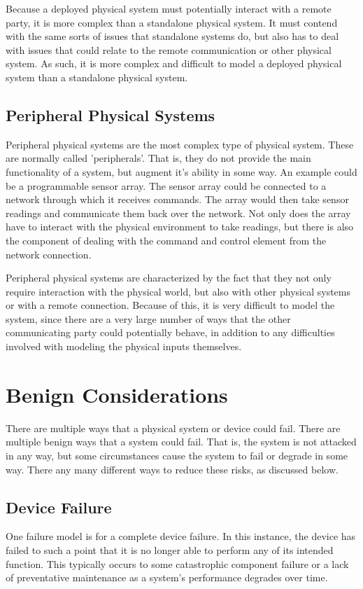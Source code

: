 Because a deployed physical system must potentially interact with a remote party, it is more complex than a standalone physical
system. It must contend with the same sorts of issues that standalone systems do, but also has to deal with issues that could
relate to the remote communication or other physical system.  As such, it is more complex and difficult to model a deployed
physical system than a standalone physical system.

\subsection{Peripheral Physical Systems}
Peripheral physical systems are the most complex type of physical system. These are normally called 'peripherals'. That
is, they do not provide the main functionality of a system, but augment it's ability in some way. An example could be a 
programmable sensor array. The sensor array could be connected to a network through which it receives commands. The array
would then take sensor readings and communicate them back over the network. Not only does the array have to 
interact with the physical environment to take readings, but there is also the component of dealing with the
command and control element from the network connection.

Peripheral physical systems are characterized by the fact that they not only require interaction with the physical world, but
also with other physical systems or with a remote connection. Because of this, it is very difficult to model the system, since
there are a very large number of ways that the other communicating party could potentially behave, in addition to any difficulties
involved with modeling the physical inputs themselves. 


\section{Benign Considerations}
There are multiple ways that a physical system or device could fail. There are multiple benign ways that a system could
fail. That is, the system is not attacked in any way, but some circumstances cause the system to fail or degrade in some
way. There any many different ways to reduce these risks, as discussed below.


\subsection{Device Failure}
One failure model is for a complete device failure. In this instance, the device has failed to such a point that it is no
longer able to perform any of its intended function. This typically occurs to some catastrophic component failure or a 
lack of preventative maintenance as a system's performance degrades over time.

